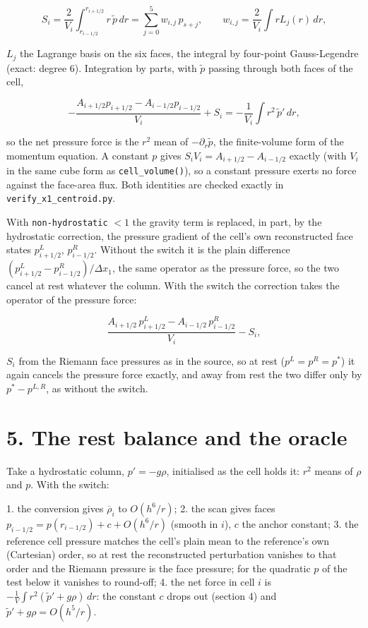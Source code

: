 \documentclass[11pt,a4paper]{article}
\begin{document}
\begin{equation*}
S_i = \frac{2}{V_i}\int_{r_{i-1/2}}^{r_{i+1/2}} r\,\tilde p\,dr = \sum_{j=0}^{5} w_{i,j}\, p_{s+j}, \qquad
w_{i,j} = \frac{2}{V_i}\int r L_j(r)\,dr ,
\end{equation*}

$L_j$ the Lagrange basis on the six faces, the integral by four-point Gauss-Legendre (exact: degree 6).
Integration by parts, with $\tilde p$ passing through both faces of the cell,

\begin{equation*}
-\frac{A_{i+1/2} p_{i+1/2} - A_{i-1/2} p_{i-1/2}}{V_i} + S_i = -\frac{1}{V_i}\int r^2\,\tilde p'\,dr ,
\end{equation*}

so the net pressure force is the $r^2$ mean of $-\partial_r\tilde p$, the finite-volume form of the momentum
equation. A constant $p$ gives $S_i V_i = A_{i+1/2} - A_{i-1/2}$ exactly (with $V_i$ in the same cube form as
\texttt{cell\_volume()}), so a constant pressure exerts no force against the face-area flux. Both identities are
checked exactly in \texttt{verify\_x1\_centroid.py}.

With \texttt{non-hydrostatic} $< 1$ the gravity term is replaced, in part, by the hydrostatic correction, the pressure
gradient of the cell's own reconstructed face states $p^L_{i+1/2}$, $p^R_{i-1/2}$. Without the switch it is the
plain difference $(p^L_{i+1/2} - p^R_{i-1/2})/\Delta x_1$, the same operator as the pressure force, so the two
cancel at rest whatever the column. With the switch the correction takes the operator of the pressure force:

\begin{equation*}
\frac{A_{i+1/2}\,p^L_{i+1/2} - A_{i-1/2}\,p^R_{i-1/2}}{V_i} - S_i ,
\end{equation*}

$S_i$ from the Riemann face pressures as in the source, so at rest ($p^L = p^R = p^*$) it again cancels the
pressure force exactly, and away from rest the two differ only by $p^* - p^{L,R}$, as without the switch.

\section*{5. The rest balance and the oracle}

Take a hydrostatic column, $p' = -g\rho$, initialised as the cell holds it: $r^2$ means of $\rho$ and $p$. With
the switch:

1. the conversion gives $\overline\rho_i$ to $O(h^6/r)$;
2. the scan gives faces $p_{i-1/2} = p(r_{i-1/2}) + c + O(h^6/r)$ (smooth in $i$), $c$ the anchor constant;
3. the reference cell pressure matches the cell's plain mean to the reference's own (Cartesian) order, so
   at rest the reconstructed perturbation vanishes to that order and the Riemann pressure is the face
   pressure; for the quadratic $p$ of the test below it vanishes to round-off;
4. the net force in cell $i$ is $-\frac{1}{V}\int r^2(\tilde p' + g\rho)\,dr$: the constant $c$ drops out
   (section 4) and $\tilde p' + g\rho = O(h^5/r)$.
\end{document}
